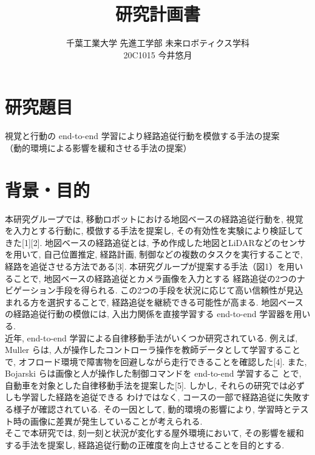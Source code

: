 \documentclass{jsarticle}
\begin{document}
\title{{\vspace*{-30mm}}{\huge 研究計画書}}
\author{\large 千葉工業大学 先進工学部 未来ロボティクス学科 \vspace*{2mm}\\20C1015 今井悠月}
\date{}
\maketitle




\section{研究題目}
視覚と行動の end-to-end 学習により経路追従行動を模倣する手法の提案\\
\hspace{6.25zw}（動的環境による影響を緩和させる手法の提案）

\section{背景・目的}
本研究グループでは, 移動ロボットにおける地図ベースの経路追従行動を, 視覚を入力とする行動に, 模倣する手法を提案し, 
その有効性を実験により検証してきた[1][2]. 地図ベースの経路追従とは, 予め作成した地図とLiDARなどのセンサを用いて, 
自己位置推定, 経路計画, 制御などの複数のタスクを実行することで, 経路を追従させる方法である[3]. 
本研究グループが提案する手法（図1）を用いることで, 地図ベースの経路追従とカメラ画像を入力とする
経路追従の2つのナビゲーション手段を得られる. 
この2つの手段を状況に応じて高い信頼性が見込まれる方を選択することで, 経路追従を継続できる可能性が高まる.
地図ベースの経路追従行動の模倣には, 入出力関係を直接学習する end-to-end 学習器を用いる.\\\hspace{1zw}
近年, end-to-end 学習による自律移動手法がいくつか研究されている.
例えば, Muller らは, 人が操作したコントローラ操作を教師データとして学習することで, 
オフロード環境で障害物を回避しながら走行できることを確認した[4].
また, Bojarski らは画像と人が操作した制御コマンドを end-to-end 学習するこ
とで, 自動車を対象とした自律移動手法を提案した[5].
しかし, それらの研究では必ずしも学習した経路を追従できる
わけではなく, コースの一部で経路追従に失敗する様子が確認されている.
その一因として, 動的環境の影響により, 学習時とテスト時の画像に差異が発生していることが考えられる.\\\hspace{1zw}
そこで本研究では, 刻一刻と状況が変化する屋外環境において, その影響を緩和する手法を提案し, 
経路追従行動の正確度を向上させることを目的とする.
\end{document}
